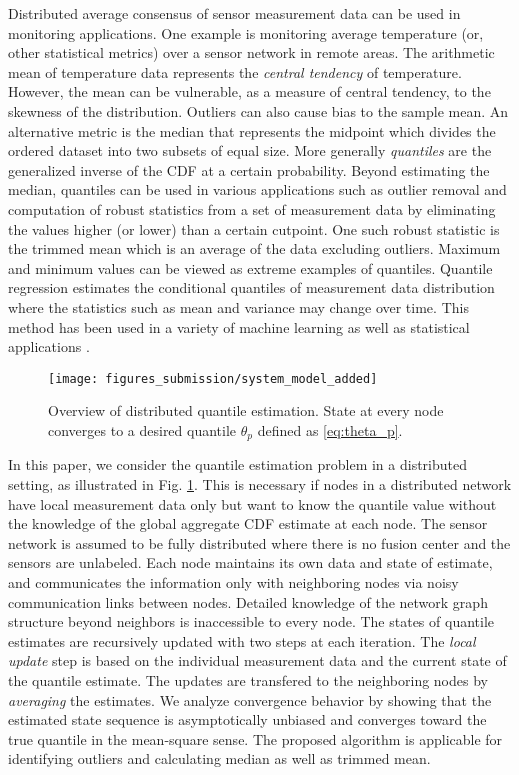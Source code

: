 \documentclass[journal]{IEEEtran}
\begin{document}
Distributed average consensus of sensor measurement data can be used in monitoring applications. One example is monitoring average temperature (or, other statistical metrics) over a sensor network in remote areas. The arithmetic mean of temperature data represents the \emph{central tendency} of temperature. However, the mean can be vulnerable, as a measure of central tendency, to the skewness of the distribution. Outliers can also cause bias to the sample mean. An alternative metric is the median that represents the midpoint which divides the ordered dataset into two subsets of equal size. More generally \emph{quantiles} are the generalized inverse of the CDF at a certain probability. Beyond estimating the median, quantiles can be used in various applications such as outlier removal and computation of robust statistics from a set of measurement data by eliminating the values higher (or lower) than a certain cutpoint. One such robust statistic is the trimmed mean which is an average of the data excluding outliers. Maximum and minimum values can be viewed as extreme examples of quantiles. Quantile regression estimates the conditional quantiles of measurement data distribution where the statistics such as mean and variance may change over time. This method has been used in a variety of machine learning \cite{Meinshausen2006} as well as statistical applications \cite{Koenker2005}.


\begin{figure}
	\centering
	\vspace{-0mm}
	\texttt{[image: figures\_submission/system\_model\_added]}
	\caption{Overview of distributed quantile estimation. State at every node converges to a desired quantile $\theta_p$ defined as \eqref{eq:theta_p}.}
	\vspace{-6mm}
	\label{fig:system_model}
\end{figure}


In this paper, we consider the quantile estimation problem in a distributed setting, as illustrated in Fig. \ref{fig:system_model}. This is necessary if nodes in a distributed network have local measurement data only but want to know the quantile value without the knowledge of the global aggregate CDF estimate at each node. The sensor network is assumed to be fully distributed where there is no fusion center and the sensors are unlabeled. Each node maintains its own data and state of estimate, and communicates the information only with neighboring nodes via noisy communication links between nodes. Detailed knowledge of the network graph structure beyond neighbors is inaccessible to every node. The states of quantile estimates are recursively updated with two steps at each iteration. The \emph{local update} step is based on the individual measurement data and the current state of the quantile estimate. The updates are transfered to the neighboring nodes by \emph{averaging} the estimates. We analyze convergence behavior by showing that the estimated state sequence is asymptotically unbiased and converges toward the true quantile in the mean-square sense. The proposed algorithm is applicable for identifying outliers and calculating median as well as trimmed mean.  
\end{document}

